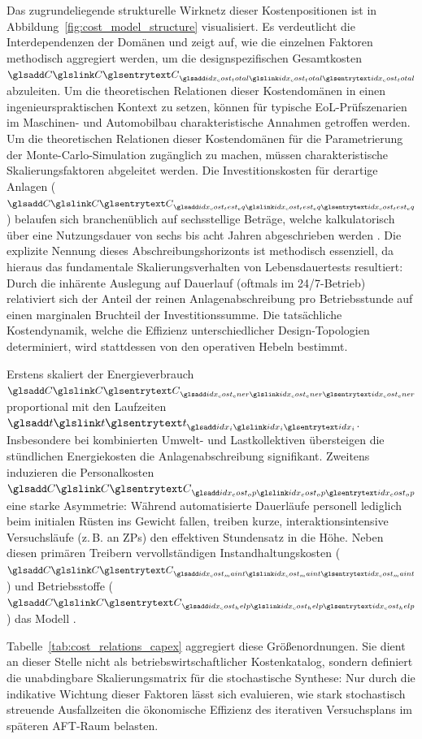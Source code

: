 Das zugrundeliegende strukturelle Wirknetz dieser Kostenpositionen ist in Abbildung~\ref{fig:cost_model_structure} visualisiert.
Es verdeutlicht die Interdependenzen der Domänen und zeigt auf, wie die einzelnen Faktoren methodisch aggregiert werden, um die designspezifischen Gesamtkosten $\sym{C}_{\sym{idx_cost_total}}$ abzuleiten.
Um die theoretischen Relationen dieser Kostendomänen in einen ingenieurspraktischen Kontext zu setzen, können für typische \ac{EoL}-Prüfszenarien im Maschinen- und Automobilbau charakteristische Annahmen getroffen werden.
Um die theoretischen Relationen dieser Kostendomänen für die Parametrierung der Monte-Carlo-Simulation zugänglich zu machen, müssen charakteristische Skalierungsfaktoren abgeleitet werden.
Die Investitionskosten für derartige Anlagen ($\sym{C}_{\sym{idx_cost_test_eq}}$) belaufen sich branchenüblich auf sechsstellige Beträge, welche kalkulatorisch über eine Nutzungsdauer von sechs bis acht Jahren abgeschrieben werden \cite{AfA.2000}.
Die explizite Nennung dieses Abschreibungshorizonts ist methodisch essenziell, da hieraus das fundamentale Skalierungsverhalten von Lebensdauertests resultiert:
Durch die inhärente Auslegung auf Dauerlauf (oftmals im 24/7-Betrieb) relativiert sich der Anteil der reinen Anlagenabschreibung pro Betriebsstunde auf einen marginalen Bruchteil der Investitionssumme.
Die tatsächliche Kostendynamik, welche die Effizienz unterschiedlicher Design-Topologien determiniert, wird stattdessen von den operativen Hebeln bestimmt.

Erstens skaliert der Energieverbrauch $\sym{C}_{\sym{idx_cost_ener}}$ proportional mit den Laufzeiten $\sym{t}_{\sym{idx_i}}$. Insbesondere bei kombinierten Umwelt- und Lastkollektiven übersteigen die stündlichen Energiekosten die Anlagenabschreibung signifikant.
Zweitens induzieren die Personalkosten $\sym{C}_{\sym{idx_cost_op}}$ eine starke Asymmetrie: Während automatisierte Dauerläufe personell lediglich beim initialen Rüsten ins Gewicht fallen, treiben kurze, interaktionsintensive Versuchsläufe (z.\,B. an \acp{ZP}) den effektiven Stundensatz in die Höhe.
Neben diesen primären Treibern vervollständigen Instandhaltungskosten ($\sym{C}_{\sym{idx_cost_maint}}$) und Betriebsstoffe ($\sym{C}_{\sym{idx_cost_help}}$) das Modell \cite{VDI2884, Ehrlenspiel.2017, VDI3258}.

Tabelle~\ref{tab:cost_relations_capex} aggregiert diese Größenordnungen.
Sie dient an dieser Stelle nicht als betriebswirtschaftlicher Kostenkatalog, sondern definiert die unabdingbare Skalierungsmatrix für die stochastische Synthese:
Nur durch die indikative Wichtung dieser Faktoren lässt sich evaluieren, wie stark stochastisch streuende Ausfallzeiten die ökonomische Effizienz des iterativen Versuchsplans im späteren \ac{AFT}-Raum belasten.

